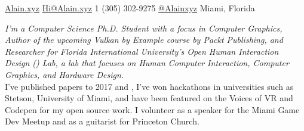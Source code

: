 \documentclass[10pt,a4paper]{article}
\begin{document}
 

\noindent \href{https://alain.xyz}{Alain.xyz} \bull \href{mailto:hi@Alain.xyz}{Hi@Alain.xyz} \bull
\textsmaller{+}1 (305) 302-9275 \bull \href{https://twitter.com/Alainxyz}{@Alainxyz} \bull Miami, Florida

\spacedhrule{0.9em}{-0.4em}



\vspace{-1.3em}

\begin{multicols}{2}
\noindent \textit{I'm a Computer Science Ph.D. Student with a focus in Computer Graphics, Author of the upcoming Vulkan by Example course by Packt Publishing, and Researcher for Florida International University's Open Human Interaction Design () Lab, a lab that focuses on Human Computer Interaction, Computer Graphics, and Hardware Design.} \\

I've published papers to  2017 and , I've won hackathons in universities such as Stetson, University of Miami, and have been featured on the Voices of VR and Codepen for my open source work. I volunteer as a speaker for the Miami Game Dev Meetup and as a guitarist for Princeton Church.
\end{multicols}
\end{document}

